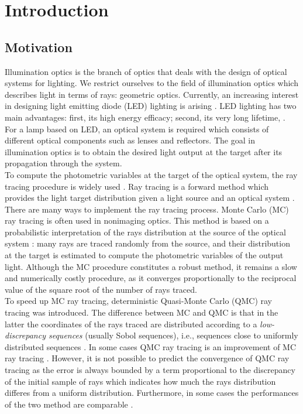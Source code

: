 \chapter{Introduction}
\section{Motivation}
Illumination optics is the branch of optics that deals with the design of optical systems for lighting. We restrict ourselves to the field of illumination optics which describes light in terms of rays: geometric optics. 
Currently, an increasing interest in designing light emitting
diode (LED) lighting is arising \cite{moreno2008modeling}. LED lighting has two main
advantages: first, its high energy efficacy; second, its very long lifetime, \cite{taguchi2008present, haitz2011solid}. For a lamp based on LED, an optical system is required
which consists of different optical components such
as lenses and reflectors. The goal in illumination optics is to
obtain the desired light output at the target after its propagation through the system.
\\ \indent To compute the photometric variables at the target of the
optical system, the ray tracing procedure is widely used \cite{glassner1989introduction}.
Ray tracing is a forward method which provides the light target distribution given a light source and an optical system \cite{Gross2005Handbook}. There are many ways to implement the ray tracing
process. Monte Carlo (MC) ray tracing is often used in nonimaging
optics. This method is based on a probabilistic interpretation
of the rays distribution at the source of the optical
system \cite{liu2010precise,Ting:1}: many rays are traced randomly from the source,
and their distribution at the target is estimated to compute the
photometric variables of the output light. Although the MC
procedure constitutes a robust method, it remains a slow and
numerically costly procedure, as it converges proportionally
to the reciprocal value of the square root of the number of rays
traced. \\ \indent To speed up MC ray tracing, deterministic Quasi-Monte Carlo (QMC) ray tracing was introduced. The difference between MC and QMC is that in the latter the coordinates of the rays traced are distributed according to a \textit{low-discrepancy sequences} (usually Sobol sequences), i.e., sequences close to uniformly distributed sequences \cite{levy2002introduction}. 
In some cases QMC ray tracing is an improvement of MC ray tracing \cite{ohbuchi1996quasi, caflisch1998monte}. However, it is not possible to predict the convergence of QMC ray tracing as the error is always bounded by a term proportional to the discrepancy of the initial sample of rays which indicates how much the rays distribution differes from a uniform distribution. Furthermore, in some cases the performances of the two method are comparable \cite{tuffin2004randomization}. 
